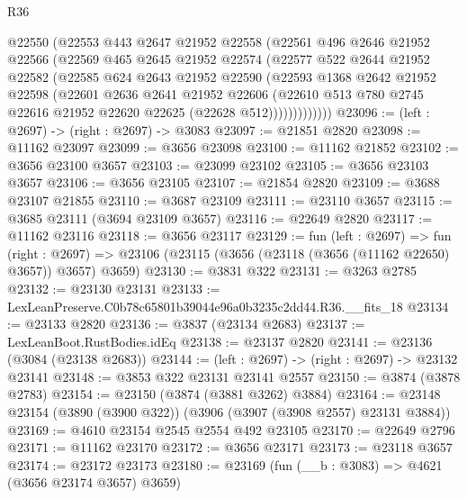 \begin{lexlean}{R36}
\begin{coremodule}
            @22550
            (@22553
              @443
              @2647
              @21952
              @22558
              (@22561
                @496
                @2646
                @21952
                @22566
                (@22569
                  @465
                  @2645
                  @21952
                  @22574
                  (@22577
                    @522
                    @2644
                    @21952
                    @22582
                    (@22585
                      @624
                      @2643
                      @21952
                      @22590
                      (@22593
                        @1368
                        @2642
                        @21952
                        @22598
                        (@22601
                          @2636
                          @2641
                          @21952
                          @22606
                          (@22610
                            @513
                            @780
                            @2745
                            @22616
                            @21952
                            @22620
                            @22625
                            (@22628 @512)))))))))))))
@23096 := (left : @2697) -> (right : @2697) -> @3083
@23097 := @21851 @2820
@23098 := @11162 @23097
@23099 := @3656 @23098
@23100 := @11162 @21852
@23102 := @3656 @23100 @3657
@23103 := @23099 @23102
@23105 := @3656 @23103 @3657
@23106 := @3656 @23105
@23107 := @21854 @2820
@23109 := @3688 @23107 @21855
@23110 := @3687 @23109
@23111 := @23110 @3657
@23115 := @3685 @23111 (@3694 @23109 @3657)
@23116 := @22649 @2820
@23117 := @11162 @23116
@23118 := @3656 @23117
@23129 := fun (left : @2697) =>
  fun (right : @2697) => @23106 (@23115 (@3656 (@23118 (@3656 (@11162 @22650) @3657)) @3657) @3659)
@23130 := @3831 @322
@23131 := @3263 @2785
@23132 := @23130 @23131
@23133 := LexLeanPreserve.C0b78c65801b39044e96a0b3235c2dd44.R36.__fits_18
@23134 := @23133 @2820
@23136 := @3837 (@23134 @2683)
@23137 := LexLeanBoot.RustBodies.idEq
@23138 := @23137 @2820
@23141 := @23136 (@3084 (@23138 @2683))
@23144 := (left : @2697) -> (right : @2697) -> @23132 @23141
@23148 := @3853 @322 @23131 @23141 @2557
@23150 := @3874 (@3878 @2783)
@23154 := @23150 (@3874 (@3881 @3262) @3884)
@23164 := @23148 @23154 (@3890 (@3900 @322)) (@3906 (@3907 (@3908 @2557) @23131 @3884))
@23169 := @4610 @23154 @2545 @2554 @492 @23105
@23170 := @22649 @2796
@23171 := @11162 @23170
@23172 := @3656 @23171
@23173 := @23118 @3657
@23174 := @23172 @23173
@23180 := @23169 (fun (__b : @3083) => @4621 (@3656 @23174 @3657) @3659)

\end{coremodule}
\end{lexlean}
